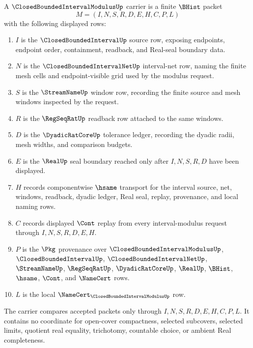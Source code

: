 \begin{definition}
\label{def:closed-bounded-interval-modulus-carrier}
A $\ClosedBoundedIntervalModulusUp$ carrier is a finite $\BHist$ packet
$$
M=(I,N,S,R,D,E,H,C,P,L)
$$
with the following displayed rows:
\begin{enumerate}
\item $I$ is the $\ClosedBoundedIntervalUp$ source row, exposing endpoints, endpoint order, containment, readback, and Real-seal boundary data.
\item $N$ is the $\ClosedBoundedIntervalNetUp$ interval-net row, naming the finite mesh cells and endpoint-visible grid used by the modulus request.
\item $S$ is the $\StreamNameUp$ window row, recording the finite source and mesh windows inspected by the request.
\item $R$ is the $\RegSeqRatUp$ readback row attached to the same windows.
\item $D$ is the $\DyadicRatCoreUp$ tolerance ledger, recording the dyadic radii, mesh widths, and comparison budgets.
\item $E$ is the $\RealUp$ seal boundary reached only after $I,N,S,R,D$ have been displayed.
\item $H$ records componentwise $\hsame$ transport for the interval source, net, windows, readback, dyadic ledger, Real seal, replay, provenance, and local naming rows.
\item $C$ records displayed $\Cont$ replay from every interval-modulus request through $I,N,S,R,D,E,H$.
\item $P$ is the $\Pkg$ provenance over $\ClosedBoundedIntervalModulusUp$, $\ClosedBoundedIntervalUp$, $\ClosedBoundedIntervalNetUp$, $\StreamNameUp$, $\RegSeqRatUp$, $\DyadicRatCoreUp$, $\RealUp$, $\BHist$, $\hsame$, $\Cont$, and $\NameCert$ rows.
\item $L$ is the local $\NameCert_{\ClosedBoundedIntervalModulusUp}$ row.
\end{enumerate}
The carrier compares accepted packets only through $I,N,S,R,D,E,H,C,P,L$. It contains no coordinate for open-cover compactness, selected subcovers, selected limits, quotient real equality, trichotomy, countable choice, or ambient Real completeness.
\end{definition}

